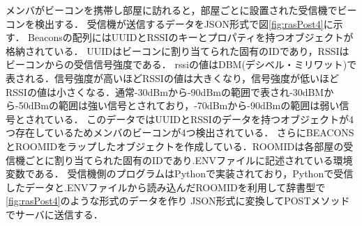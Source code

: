 

メンバがビーコンを携帯し部屋に訪れると，部屋ごとに設置された受信機でビーコンを検出する．
受信機が送信するデータをJSON形式で図\ref{fig:rasPost4}に示す．
Beaconsの配列にはUUIDとRSSIのキーとプロパティを持つオブジェクトが格納されている．
UUIDはビーコンに割り当てられた固有のIDであり，RSSIはビーコンからの受信信号強度である．
rssiの値はDBM(デシベル・ミリワット)で表される．信号強度が高いほどRSSIの値は大きくなり，信号強度が低いほどRSSIの値は小さくなる．通常-30dBmから-90dBmの範囲で表され-30dBMから-50dBmの範囲は強い信号とされており，-70dBmから-90dBmの範囲は弱い信号とされている．
このデータではUUIDとRSSIのデータを持つオブジェクトが4つ存在しているためメンバのビーコンが4つ検出されている．
さらにBEACONSとROOMIDをラップしたオブジェクトを作成している．ROOMIDは各部屋の受信機ごとに割り当てられた固有のIDであり.ENVファイルに記述されている環境変数である．
受信機側のプログラムはPythonで実装されており，Pythonで受信したデータと.ENVファイルから読み込んだROOMIDを利用して辞書型で\ref{fig:rasPost4}のような形式のデータを作り
JSON形式に変換してPOSTメソッドでサーバに送信する．


